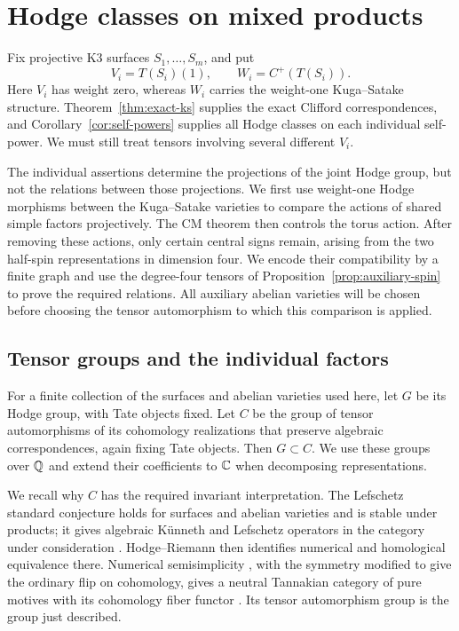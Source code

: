 \section{Hodge classes on mixed products}\label{sec:mixed}

Fix projective K3 surfaces $S_1,\ldots,S_m$, and put
\[
 V_i=T(S_i)(1),\qquad W_i=C^+(T(S_i)).
\]
Here $V_i$ has weight zero, whereas $W_i$ carries the weight-one
Kuga--Satake structure.  Theorem~\ref{thm:exact-ks} supplies the exact
Clifford correspondences, and Corollary~\ref{cor:self-powers} supplies all
Hodge classes on each individual self-power.  We must still treat tensors
involving several different $V_i$.

The individual assertions determine the projections of the joint Hodge
group, but not the relations between those projections.  We first use
weight-one Hodge morphisms between the Kuga--Satake varieties to compare
the actions of shared simple factors projectively.  The CM theorem then
controls the torus action.  After removing these actions, only certain
central signs remain, arising from the two half-spin representations in
dimension four.  We encode their compatibility by a finite graph and use
the degree-four tensors of Proposition~\ref{prop:auxiliary-spin} to prove
the required relations.  All auxiliary abelian varieties will be chosen
before choosing the tensor automorphism to which this comparison is
applied.

\subsection{Tensor groups and the individual factors}

For a finite collection of the surfaces and abelian varieties used here,
let $G$ be its Hodge group, with Tate objects fixed.  Let $C$ be the group
of tensor automorphisms of its cohomology realizations that preserve
algebraic correspondences, again fixing Tate objects.  Then $G\subset C$.
We use these groups over $\mathbb Q$ and extend their coefficients to $\mathbb C$ when
decomposing representations.

We recall why $C$ has the required invariant interpretation.  The
Lefschetz standard conjecture holds for surfaces and abelian varieties
and is stable under products; it gives algebraic K\"unneth and Lefschetz
operators in the category under consideration
\cite{KleimanStandard}.  Hodge--Riemann then identifies numerical and
homological equivalence there.  Numerical semisimplicity
\cite{JannsenMotives}, with the symmetry modified to give the ordinary
flip on cohomology, gives a neutral Tannakian category of pure motives
with its cohomology fiber functor \cite{DeligneMilneTannakian}.
Its tensor automorphism group is the group just described.

